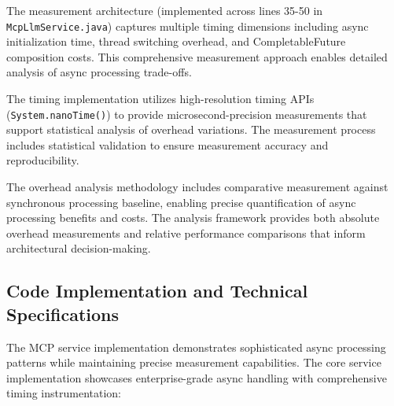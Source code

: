 The measurement architecture (implemented across lines 35-50 in \texttt{McpLlmService.java}) captures multiple timing dimensions including async initialization time, thread switching overhead, and CompletableFuture composition costs. This comprehensive measurement approach enables detailed analysis of async processing trade-offs.


The timing implementation utilizes high-resolution timing APIs (\texttt{System.nanoTime()}) to provide microsecond-precision measurements that support statistical analysis of overhead variations. The measurement process includes statistical validation to ensure measurement accuracy and reproducibility.

The overhead analysis methodology includes comparative measurement against synchronous processing baseline, enabling precise quantification of async processing benefits and costs. The analysis framework provides both absolute overhead measurements and relative performance comparisons that inform architectural decision-making.

\subsection{Code Implementation and Technical Specifications}

The MCP service implementation demonstrates sophisticated async processing patterns while maintaining precise measurement capabilities. The core service implementation showcases enterprise-grade async handling with comprehensive timing instrumentation:


